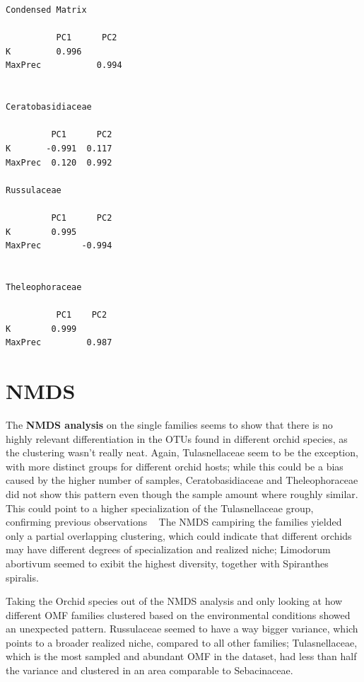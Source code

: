 \begin{verbatim}
Condensed Matrix

          PC1      PC2
K         0.996
MaxPrec           0.994


Ceratobasidiaceae

         PC1      PC2
K       -0.991  0.117                                                                                                                                                 
MaxPrec  0.120  0.992  

Russulaceae

         PC1      PC2
K        0.995                                                                                                                        
MaxPrec        -0.994 


Theleophoraceae

          PC1    PC2
K        0.999                                                                                                                        
MaxPrec         0.987
\end{verbatim}

\chapter{NMDS}
\label{nmds}

The \textbf{NMDS analysis} on the single families seems to show that there is no highly relevant differentiation in the OTUs found in different orchid species, as the clustering wasn't really neat.
Again, Tulasnellaceae seem to be the exception, with more distinct groups for different orchid hosts; while this could be a bias caused by the higher number of samples, Ceratobasidiaceae and Theleophoraceae did not show this pattern even though the sample amount where roughly similar. This could point to a higher specialization of the Tulasnellaceae group, confirming previous observations ~\citep{dearnaley2007}
The NMDS campiring the families yielded only a partial overlapping clustering, which could indicate that different orchids may have different degrees of specialization and realized niche; Limodorum abortivum seemed to exibit the highest diversity, together with Spiranthes spiralis.

Taking the Orchid species out of the NMDS analysis and only looking at how different OMF families clustered based on the environmental conditions showed an unexpected pattern. Russulaceae seemed to have a way bigger variance, which points to a broader realized niche, compared to all other families; Tulasnellaceae, which is the most sampled and abundant OMF in the dataset, had less than half the variance and clustered in an area comparable to Sebacinaceae.

